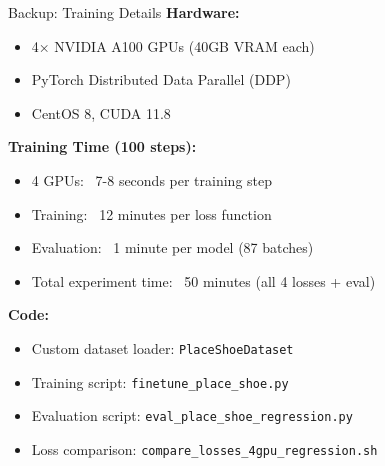 \documentclass[aspectratio=169]{beamer}
\begin{document}
\begin{frame}{Backup: Training Details}
\textbf{Hardware:}
\begin{itemize}
    \item 4× NVIDIA A100 GPUs (40GB VRAM each)
    \item PyTorch Distributed Data Parallel (DDP)
    \item CentOS 8, CUDA 11.8
\end{itemize}

\vspace{0.3cm}
\textbf{Training Time (100 steps):}
\begin{itemize}
    \item 4 GPUs: ~7-8 seconds per training step
    \item Training: ~12 minutes per loss function
    \item Evaluation: ~1 minute per model (87 batches)
    \item Total experiment time: ~50 minutes (all 4 losses + eval)
\end{itemize}

\vspace{0.3cm}
\textbf{Code:}
\begin{itemize}
    \item Custom dataset loader: \texttt{PlaceShoeDataset}
    \item Training script: \texttt{finetune\_place\_shoe.py}
    \item Evaluation script: \texttt{eval\_place\_shoe\_regression.py}
    \item Loss comparison: \texttt{compare\_losses\_4gpu\_regression.sh}
\end{itemize}
\end{frame}
\end{document}
